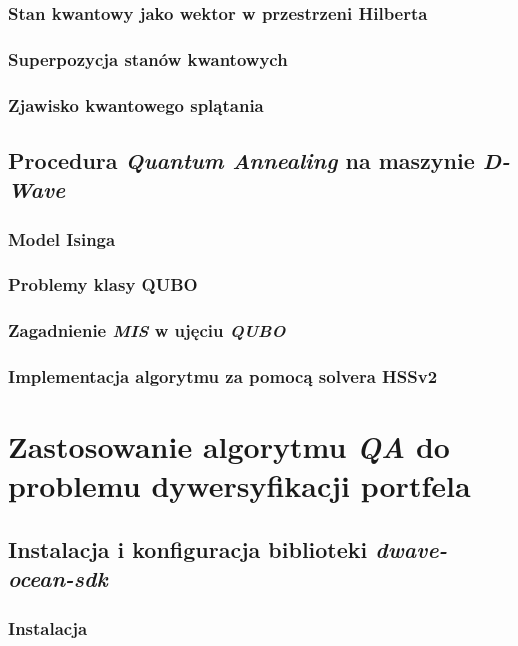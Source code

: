 \documentclass[12pt,a4paper,twoside,openany]{book}
\begin{document}
\subsection{Stan kwantowy jako wektor w przestrzeni Hilberta}

\subsection{Superpozycja stanów kwantowych}

\subsection{Zjawisko kwantowego splątania}

\section{Procedura \textit{Quantum Annealing} na maszynie \textit{D-Wave}}

\subsection{Model Isinga}

\subsection{Problemy klasy QUBO}

\subsection{Zagadnienie \textit{MIS} w ujęciu \textit{QUBO}}

\subsection{Implementacja algorytmu za pomocą solvera HSSv2}




\chapter{Zastosowanie algorytmu \textit{QA} do problemu dywersyfikacji portfela}

\section{Instalacja i konfiguracja biblioteki \textit{dwave-ocean-sdk}}
\subsection{Instalacja}
\end{document}
